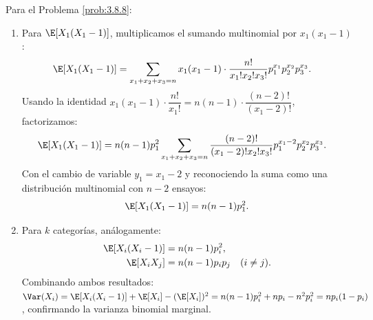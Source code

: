 \begin{solucion}
	\label{sol:3.8.8}
	Para el Problema \ref{prob:3.8.8}:
	\begin{enumerate}
		\item Para $\E[X_{1}(X_{1}-1)]$, multiplicamos el sumando multinomial por $x_{1}(x_{1}-1)$:
		\begin{align*}
			\E[X_{1}(X_{1}-1)] &= \sum_{x_{1}+x_{2}+x_{3}=n} x_{1}(x_{1}-1) \cdot \dfrac{n!}{x_{1}! x_{2}! x_{3}!} p_{1}^{x_{1}} p_{2}^{x_{2}} p_{3}^{x_{3}}.
		\end{align*}
		Usando la identidad $x_{1}(x_{1}-1) \cdot \dfrac{n!}{x_{1}!} = n(n-1) \cdot \dfrac{(n-2)!}{(x_{1}-2)!}$, factorizamos:
		\begin{align*}
			\E[X_{1}(X_{1}-1)] &= n(n-1) p_{1}^{2} \sum_{x_{1}+x_{2}+x_{3}=n} \dfrac{(n-2)!}{(x_{1}-2)! x_{2}! x_{3}!} p_{1}^{x_{1}-2} p_{2}^{x_{2}} p_{3}^{x_{3}}.
		\end{align*}
		Con el cambio de variable $y_{1} = x_{1} - 2$ y reconociendo la suma como una distribución multinomial con $n - 2$ ensayos:
		\begin{align*}
			\E[X_{1}(X_{1}-1)] = n(n-1) p_{1}^{2}.
		\end{align*}
		\item Para $k$ categorías, análogamente:
		\begin{align*}
			\E[X_{i}(X_{i}-1)] &= n(n-1) p_{i}^{2}, \\
			\E[X_{i} X_{j}] &= n(n-1) p_{i} p_{j} \quad (i \neq j).
		\end{align*}
		Combinando ambos resultados: $\Var(X_{i}) = \E[X_{i}(X_{i}-1)] + \E[X_{i}] - (\E[X_{i}])^{2} = n(n-1)p_{i}^{2} + np_{i} - n^{2}p_{i}^{2} = np_{i}(1-p_{i})$, confirmando la varianza binomial marginal. \qedhere
	\end{enumerate}
\end{solucion}

